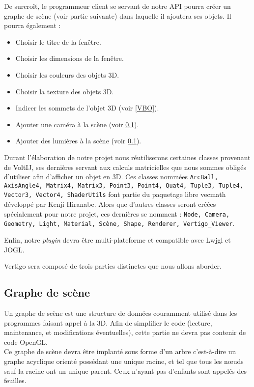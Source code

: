 \documentclass[11pt]{report}
\begin{document}
De surcroît, le programmeur client se servant de notre API pourra créer un graphe de scène (voir partie suivante) dans laquelle il ajoutera ses objets. 
Il pourra également :
\begin{itemize}
\item Choisir le titre de la fenêtre.
\item Choisir les dimensions de la fenêtre.
\item Choisir les couleurs des objets 3D.
\item Choisir la texture des objets 3D.
\item Indicer les sommets de l'objet 3D (voir \ref{VBO}).
\item Ajouter une caméra à la scène (voir \ref{gScene}).
\item Ajouter des lumières à la scène (voir \ref{gScene}).
\end{itemize}

Durant l'élaboration de notre projet nous réutiliserons certaines classes provenant de VoltIJ, ses dernières servant aux calculs matricielles que nous sommes obligés d'utiliser afin d'afficher un objet en 3D. Ces classes nommées \texttt{ArcBall, AxisAngle4, Matrix4, Matrix3, Point3, Point4, Quat4, Tuple3, Tuple4, Vector3, Vector4, ShaderUtils}
font partie du paquetage libre vecmath développé par Kenji Hiranabe.
Alors que d'autres classes seront créées spécialement pour notre projet, ces dernières se nomment : \texttt{Node, Camera, Geometry, Light, Material, Scène, Shape, Renderer, Vertigo\_Viewer}.

Enfin, notre \textit{plugin} devra être multi-plateforme et compatible avec Lwjgl et JOGL.

Vertigo sera composé de trois parties distinctes que nous allons aborder.
\subsection{Graphe de scène} \label{gScene}
Un graphe de scène est une structure de données couramment utilisé dans les programmes faisant appel à la 3D.
Afin de simplifier le code (lecture, maintenance, et modifications éventuelles), cette partie ne devra pas contenir de code OpenGL.\\

Ce graphe de scène devra être implanté sous forme d'un arbre c'est-à-dire un graphe acyclique orienté possédant une unique racine, et tel que tous les nœuds sauf la racine ont un unique parent. Ceux n'ayant pas d'enfants sont appelés des feuilles. \\
\end{document}
